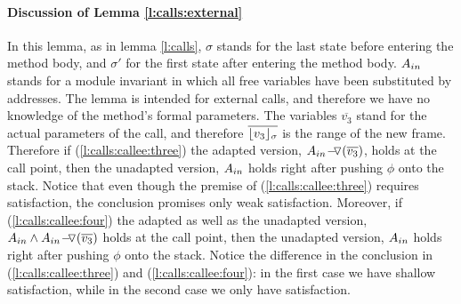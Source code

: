 \paragraph{Discussion of Lemma \ref{l:calls:external}} In this lemma,  as in  lemma \ref{l:calls}, 
  $\sigma$ stands for the last state before entering the method body, and $\sigma'$ for the first state after entering the method body.
$A_{in}$ stands for a module invariant in which all free variables have been substituted by addresses.
The lemma is intended for external calls, and therefore we have no knowledge of the method's formal parameters.
The variables   $\overline {v_3}$ stand for the actual parameters of the call, and therefore 
 $\overline {\lfloor v_3 \rfloor_{\sigma}}$ is the range of the new frame.
Therefore if (\ref{l:calls:callee:three})   the adapted version,
 ${ A_{in} \!-\!\!\!\,\!{\triangledown} (\overline {v_3}) }$, holds  at the call point,
 then the unadapted version, $A_{in}$  holds right after pushing $\phi$ onto the stack.
 Notice that  even though the premise of (\ref{l:calls:callee:three}) requires \strong satisfaction, the conclusion promises
 only weak satisfaction.
 Moreover, if (\ref{l:calls:callee:four})   the adapted as well as the unadapted version,
 $A_{in} \wedge {\ensuremath{ A_{in} \!-\!\!\!\,\!{\triangledown} (\overline {v_3})} }$
 holds  at the call point,
 then the unadapted version, $A_{in}$  holds right after pushing $\phi$ onto the stack.
Notice the difference in the conclusion in (\ref{l:calls:callee:three}) and (\ref{l:calls:callee:four}): in the first case we have  shallow satisfaction, while in the second case we only have \strong satisfaction.



